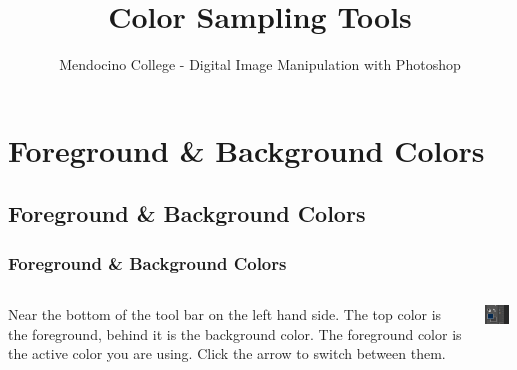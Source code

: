 \documentclass{beamer}
\title{Color Sampling Tools}
\author{Mendocino College - Digital Image Manipulation with Photoshop}
\date{\vspace{-5em}}
\begin{document}
	{
		\begin{frame}
			\vspace{-35pt}
			\maketitle
		\end{frame}
	}

		\section{Foreground \& Background Colors}
			\subsection{Foreground \& Background Colors}		
			\begin{frame}
				\frametitle{Foreground \& Background Colors}
				\begin{columns}
					\column{.6\textwidth}
					\vspace{-25pt}
					\begin{outline}
						\1 Near the bottom of the tool bar on the left hand side.
						\1 The top color is the foreground, behind it is the background color.
						\1 The foreground color is the active color you are using.
						\1 Click the arrow to switch between them.
					\end{outline}
					\column{.45\textwidth}
					\includegraphics[width=0.9\textwidth]{images/foreground and background.png}
				\end{columns}
			\end{frame}
		
\end{document}
